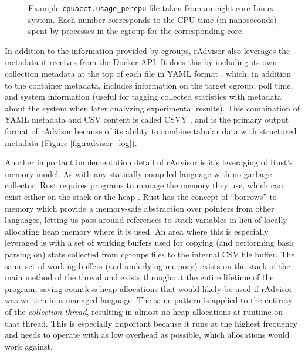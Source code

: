 \documentclass[a4paper,11pt]{article}
\newcommand{\filepath}[1]{\texttt{#1}\xspace}
\begin{document}
\begin{figure}[H]
    \caption{
        Example \filepath{cpuacct.usage\_percpu} file taken from an eight-core Linux system.
        Each number corresponds to the CPU time (in nanoseconds) spent by processes
        in the cgroup for the corresponding core.
    }
    \label{fig:cpuacct_cgroup}
\end{figure}

In addition to the information provided by cgroups,
rAdvisor also leverages the metadata it receives from the Docker API.
It does this by including its own collection metadata at the top of each file in YAML format \cite{DockerMetadata},
which, in addition to the container metadata, includes information on
the target cgroup, poll time, and system information
(useful for tagging collected statistics with metadata about the system when later analyzing experimental results).
This combination of YAML metadata and CSV content is called CSVY \cite{CSVY},
and is the primary output format of rAdvisor because of its ability to combine
tabular data with structured metadata (Figure \ref{fig:radvisor_log}).

Another important implementation detail of rAdvisor is it's leveraging of Rust's memory model.
As with any statically compiled language with no garbage collector,
Rust requires programs to manage the memory they use,
which can exist either on the stack or the heap \cite{TheRustBook}.
Rust has the concept of ``borrows'' to memory which provide a memory-safe abstraction over pointers from other languages,
letting us pass around references to stack variables in lieu of locally allocating heap memory where it is used.
An area where this is especially leveraged is with a set of working buffers used for copying (and performing basic parsing on)
stats collected from cgroups files to the internal CSV file buffer.
The same set of working buffers (and underlying memory) exists on the stack of the main method of the thread
and exists throughout the entire lifetime of the program,
saving countless heap allocations that would likely be used if rAdvisor was written in a managed language.
The same pattern is applied to the entirety of the \textit{collection thread},
resulting in almost no heap allocations at runtime on that thread.
This is especially important because it runs at the highest frequency and needs to operate
with as low overhead as possible, which allocations would work against. 
\end{document}
